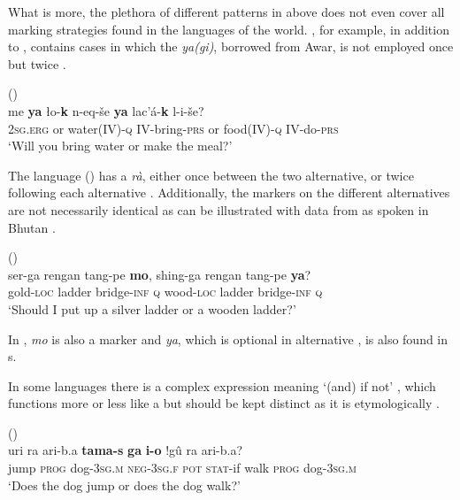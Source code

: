 What is more, the plethora of different patterns in  above does not even cover all  marking strategies found in the languages of the world. , for example, in addition to , contains cases in which the  \textit{ya(gi)}, borrowed from Awar, is not employed once but twice .

\newpage
\ea%
    \label{ex:4:18}
     ()\\
    \gll me \textbf{{ya}} ło-\textbf{{k}} n-eq-še \textbf{{ya}} lac’á-\textbf{k} l-i-še?\\
    2\textsc{sg.erg}  or  water(IV)-\textsc{q}  IV-bring-\textsc{prs}  or  food(IV)-\textsc{q} IV-do-\textsc{prs}\\
    \glt ‘Will you bring water or make the meal?’ \citep[458]{Khalilova2009}
    \z

The language  () has a  \textit{rà}, either once between the two alternative, or twice following each alternative \citep[23]{Ọmọruyi1988}. Additionally, the markers on the different alternatives are not necessarily identical as can be illustrated with data from  as spoken in Bhutan .

\ea%
    \label{ex:4:19}
     ()\\
    \gll ser-ga rengan tang-pe \textbf{{mo}}, shing-ga rengan tang-pe \textbf{ya}?\\
    gold-\textsc{loc}  ladder  bridge-\textsc{inf}  \textsc{q}  wood-\textsc{loc}  ladder  bridge-\textsc{inf} \textsc{q}\\
    \glt ‘Should I put up a silver ladder or a wooden ladder?’ \citep[193]{Andvik2010}
    \z

\noindent In , \textit{mo} is also a  marker and \textit{ya}, which is optional in alternative , is also found in s.

In some languages there is a complex expression meaning ‘(and) if not’ , which functions more or less like a  but should be kept distinct as it is etymologically .

\ea%
    \label{ex:4:20}
     ()\\
    \gll uri  ra  ari-b.a \textbf{tama-s}    \textbf{ga}  \textbf{i-o} !gû  ra  ari-b.a?\\
    jump  \textsc{prog}  dog-3\textsc{sg.m}  \textsc{neg}-3\textsc{sg.f}  \textsc{pot}  \textsc{stat}-if walk  \textsc{prog}  dog-3\textsc{sg.m}\\
    \glt ‘Does the dog jump or does the dog walk?’ \citep[2733]{Hoymann2010}
    \z

